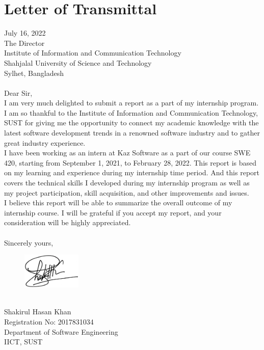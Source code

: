 \chapter*{Letter of Transmittal}

July 16, 2022\\
The Director\\
Institute of Information and Communication Technology\\
Shahjalal University of Science and Technology\\
Sylhet, Bangladesh\\\\
Dear Sir,\\
I am very much delighted to submit a report as a part of my internship program.
I am so thankful to the Institute of Information and Communication Technology, SUST for giving me the opportunity to connect my academic knowledge with the latest software development trends in a renowned software industry and to gather great industry experience.\\
I have been working as an intern at Kaz Software as a part of our course SWE 420, starting from September 1, 2021, to February 28, 2022.
This report is based on my learning and experience during my internship time period. And this report covers the technical skills I developed during my internship program as well as my project participation, skill acquisition, and other improvements and issues.\\
I believe this report will be able to summarize the overall outcome of my internship course.
I will be grateful if you accept my report, and your consideration will be highly appreciated.\\\\
Sincerely yours,\\
\begin{figure}[h]
    \includegraphics[width= 0.25\textwidth]{images/LetterOfTransmittal/mySignCropped.jpg}  
    \label{fig:mySign}
\end{figure}\\
Shakirul Hasan Khan\\
Registration No: 2017831034\\
Department of Software Engineering\\
IICT, SUST